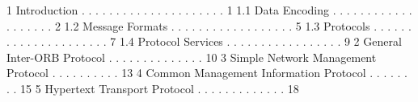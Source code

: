 1 Introduction . . . . . . . . . . . . . . . . . . . . .  1
  1.1 Data Encoding . . . . . . . . . . . . . . . . . . . 2
  1.2 Message Formats . . . . . . . . . . . . . . . . . . 5
  1.3 Protocols . . . . . . . . . . . . . . . . . . . . . 7
  1.4 Protocol Services . . . . . . . . . . . . . . . . . 9
2 General Inter-ORB Protocol . . . . . . . . . . . . . . 10
3 Simple Network Management Protocol . . . . . . . . . . 13
4 Common Management Information Protocol . . . . . . . . 15
5 Hypertext Transport Protocol . . . . . . . . . . . . . 18
